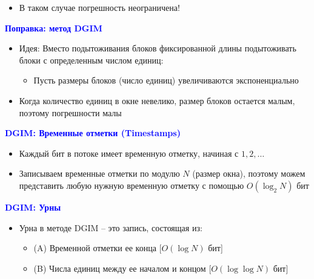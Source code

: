 \documentclass[landscape]{slides}
\begin{document}
\begin{normalsize}
\begin{slide}
\begin{itemize}
\item В таком случае погрешность неограничена!
\end{itemize}
\end{slide}


\begin{slide}
\textbf{\textcolor{blue}{Поправка: метод DGIM}}


\begin{itemize}
\item Идея: Вместо подытоживания блоков фиксированной длины подытоживать блоки с определенным числом единиц:

  \begin{itemize}
  \item Пусть размеры блоков (число единиц) увеличиваются экспоненциально
  \end{itemize}

\item Когда количество единиц в окне невелико, размер блоков остается малым, поэтому погрешности малы
\end{itemize}
\end{slide}


\begin{slide}
\textbf{\textcolor{blue}{DGIM: Временные отметки (Timestamps)}}

\begin{itemize}
\item Каждый бит в потоке имеет временную отметку, начиная с $1, 2,\ldots$

\item Записываем временные отметки по модулю $N$ (размер окна),
поэтому можем представить любую нужную временную отметку с помощью
$O(\log_2 N)$ бит
\end{itemize}
\end{slide}


\begin{slide}
\textbf{\textcolor{blue}{DGIM: Урны}}

\begin{itemize}
\item Урна в методе DGIM -- это запись, состоящая из:

  \begin{itemize}
  \item (A) Временной отметки ее конца [$O(\log N)$ бит]

  \item (B) Числа единиц между ее началом и концом [$O(\log \log N)$ бит]
  \end{itemize}


\end{itemize}
\end{slide}
\end{normalsize}
\end{document}
